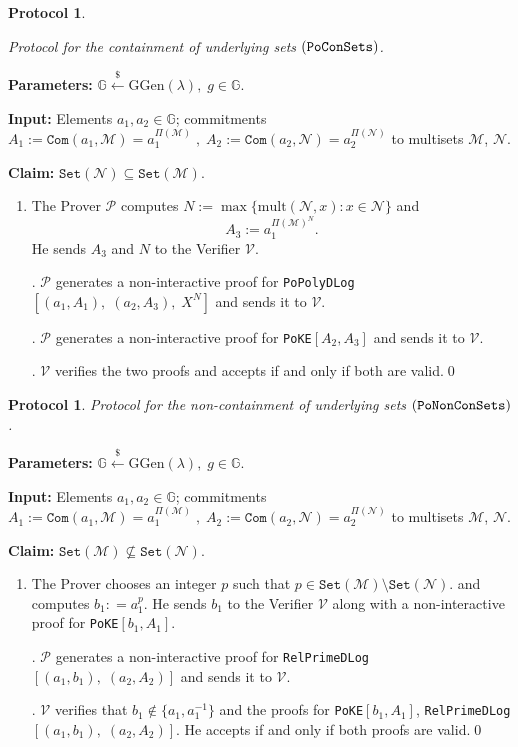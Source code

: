 \documentclass[11pt, lettersize, notitlepage, leqno, footskip=0.6cm]{article}
\newcommand{\ttt}{\texttt}
\newcommand{\sett}{\ttt{Set}}
\newcommand{\mc}{\mathcal}
\newcommand{\mb}{\mathbb}
\newcommand{\mr}{\mathrm}
\newcommand{\lamb}{\lambda}
\newcommand{\sub}{\subseteq}
\newcommand{\nsub}{\nsubseteq}
\newcommand{\mP}{\mc{P}}
\newcommand{\V}{\mc{V}}
\newcommand{\vs}{\vspace{-0.15cm}}
\newcommand{\noin}{\noindent}
\newtheorem{Prot}[Thm]{Protocol}
\numberwithin{equation}{section}
\begin{document}
\begin{Prot} \hypertarget{Sets}{Protocol for the containment of underlying sets $(\tt{PoConSets})$.}\end{Prot} \vspace{-0.3cm}

\noin \textbf{Parameters:} $\mb{G}\xleftarrow{\$} \mr{GGen}(\lamb), \; g\in \mb{G}$.

\noin \textbf{Input:} Elements $a_1,a_2\in\mb{G}$; commitments $A_1 := \ttt{Com}(a_1, \mc{M}) = a_1^{\Pi(\mc{M})}\;,\;A_2 := \ttt{Com}(a_2, \mc{N})= a_2^{\Pi(\mc{N})}$ to multisets $\mc{M}$, $\mc{N}$.

\noin \textbf{Claim:} $\sett(\mc{N})\sub \sett(\mc{M})$. \vs

\begin{enumerate}[wide, labelwidth=!, labelindent=0pt] \item The Prover $\mP$ computes $N:= \max\{\mr{mult}(\mc{N}, x):x \in \mc{N}\}$ and \vs $$A_3:= a_1^{\Pi(\mc{M})^N}.$$ He sends $A_3$ and $N$ to the Verifier $\V$.

\noin 2. $\mP$ generates a non-interactive proof for \verb|PoPolyDLog|$[(a_1, A_1),\;(a_2, A_3),\;X^N]$ and sends it to $\V$.

\noin 3. $\mP$ generates a non-interactive proof for \verb|PoKE|$[A_2,A_3]$ and sends it to $\V$.

\noin 4. $\V$ verifies the two proofs and accepts if and only if both are valid.\qed \end{enumerate}



\begin{Prot} Protocol for the non-containment of underlying sets $(\tt{PoNonConSets})$.\end{Prot}\vspace{-0.3cm}

\noin \textbf{Parameters:} $\mb{G}\xleftarrow{\$} \mr{GGen}(\lamb), \; g\in \mb{G}$. 

\noin \textbf{Input:} Elements $a_1,a_2\in\mb{G}$; commitments $A_1 := \ttt{Com}(a_1, \mc{M}) = a_1^{\Pi(\mc{M})}\;,\;A_2 := \ttt{Com}(a_2, \mc{N})= a_2^{\Pi(\mc{N})}$ to multisets $\mc{M}$, $\mc{N}$.

\noin \textbf{Claim:} $\sett(\mc{M})\nsub \sett(\mc{N})$. \vs

\begin{enumerate}[wide, labelwidth=!, labelindent=0pt] \vs \item The Prover chooses an integer $p$ such that $p\in \sett(\mc{M})\setminus \sett(\mc{N}).$ and computes $b_1: = a_1^p$. He sends $b_1$ to the Verifier $\V$ along with a non-interactive proof for \verb|PoKE|$[b_1, A_1]$.

\noin 2. $\mP$ generates a non-interactive proof for \verb|RelPrimeDLog|$[(a_1, b_1),\; (a_2, A_2)]$ and sends it to $\V$.

\noin 3. $\V$ verifies that $b_1\notin \{ a_1, a_1^{-1}\}$ and the proofs for \verb|PoKE|$[b_1, A_1]$, \verb|RelPrimeDLog|$[(a_1, b_1),\; (a_2, A_2)]$. He accepts if and only if both proofs are valid.\qed \end{enumerate}
\end{document}
